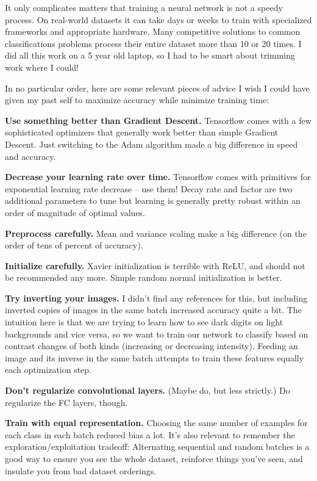 \documentclass{article}
\begin{document}
It only complicates matters that training a neural network is not a speedy process. On real-world datasets it can take days or weeks to train with specialized frameworks and appropriate hardware. Many competitive solutions to common classifications problems process their entire dataset more than 10 or 20 times. I did all this work on a 5 year old laptop, so I had to be smart about trimming work where I could!

In no particular order, here are some relevant pieces of advice I wish I could have given my past self to maximize accuracy while minimize training time:

\textbf{Use something better than Gradient Descent.} Tensorflow comes with a few sophisticated optimizers that generally work better than simple Gradient Descent. Just switching to the Adam algorithm made a big difference in speed and accuracy.

\textbf{Decrease your learning rate over time.} Tensorflow comes with primitives for exponential learning rate decrease -- use them! Decay rate and factor are two additional parameters to tune but learning is generally pretty robust within an order of magnitude of optimal values.

\textbf{Preprocess carefully.} Mean and variance scaling make a big difference (on the order of tens of percent of accuracy).

\textbf{Initialize carefully.} Xavier initialization is terrible with ReLU, and should not be recommended any more. Simple random normal initialization is better.

\textbf{Try inverting your images.} I didn't find any references for this, but including inverted copies of images in the same batch increased accuracy quite a bit. The intuition here is that we are trying to learn how to see dark digits on light backgrounds and vice versa, so we want to train our network to classify based on contrast changes of both kinds (increasing or decreasing intensity). Feeding an image and its inverse in the same batch attempts to train these features equally each optimization step.

\textbf{Don't regularize convolutional layers.}  (Maybe do, but less strictly.) Do regularize the FC layers, though.

\textbf{Train with equal representation.} Choosing the same number of examples for each class in each batch reduced bias a lot.  It's also relevant to remember the exploration/exploitation tradeoff: Alternating sequential and random batches is a good way to ensure you see the whole dataset, reinforce things you've seen, and insulate you from bad dataset orderings.
\end{document}
